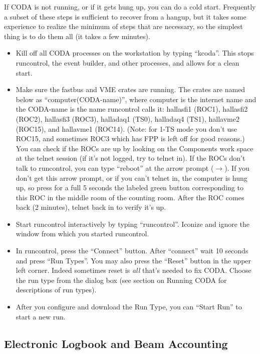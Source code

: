 \par
If CODA is not running, or if it gets hung up,
you can do a cold start.  Frequently a subset of
these steps is sufficient to recover from a hangup,
but it takes some experience to realize the
minimum of steps that
are necessary, so the simplest 
thing is to do them
all (it takes a few minutes).

\begin{itemize}
\item{Kill off all CODA processes on the workstation
by typing ``kcoda''.  This stops runcontrol, the
event builder, and other processes, and allows
for a clean start.}
\item{Make sure the fastbus and VME crates are
running.  The crates are named below as 
``computer(CODA-name)'',
where computer is the internet name and the 
CODA-name is the name runcontrol calls it: \hskip 0.05in
hallasfi1 (ROC1), hallasfi2 (ROC2), hallasfi3 (ROC3),
halladaq1 (TS0), halladaq4 (TS1), hallavme2 (ROC15),
and hallavme1 (ROC14).  (Note: for 1-TS mode
you don't use ROC15, and sometimes ROC3 which
has FPP is left off for good reasons.)  
You can check if the ROCs
are up by looking on the Components work space
at the telnet session (if it's not logged, 
try to telnet in).
If the ROCs don't talk to runcontrol, you can type
``reboot'' at the arrow prompt ($\rightarrow$).   If you
don't get this arrow prompt, or if you can't telnet in,
the computer is hung up, so press 
for a full 5 seconds
the labeled green button corresponding
to this ROC in the middle room of the counting
room.  After the ROC comes back (2 minutes),
telnet back in to verify it's up.}
\item{ Start runcontrol interactively
by typing ``runcontrol''.
Iconize and ignore the window from which 
you started runcontrol.}
\item{ In runcontrol,
press the ``Connect'' button.  
After ``connect''
wait 10 seconds and press ``Run Types''.  
You may also press the ``Reset'' button in the upper left
corner.  Indeed sometimes reset is {\it all} 
that's needed to fix CODA.
Choose the run type from the dialog box
(see section on Running
CODA for descriptions of run types).}
\item{ After you configure and download the Run Type,
you can ``Start Run'' to start a new run.}


\end{itemize}

\subsection{Electronic Logbook and Beam Accounting}

